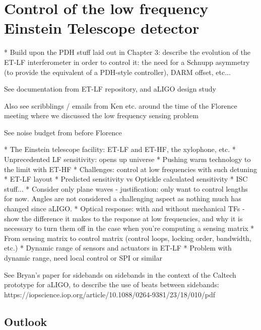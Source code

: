 \chapter{Control of the low frequency Einstein Telescope detector}
\label{c:et-lf-control}

  * Build upon the PDH stuff laid out in Chapter 3: describe the evolution of the ET-LF interferometer in order to control it: the need for a Schnupp asymmetry (to provide the equivalent of a PDH-style controller), DARM offset, etc...
  
  See documentation from ET-LF repository, and aLIGO design study
  
  Also see scribblings / emails from Ken etc. around the time of the Florence meeting where we discussed the low frequency sensing problem
  
  See noise budget from before Florence

  * The Einstein telescope facility: ET-LF and ET-HF, the xylophone, etc.
    * Unprecedented LF sensitivity: opens up universe
    * Pushing warm technology to the limit with ET-HF
    * Challenges: control at low frequencies with such detuning
  * ET-LF layout
  * Predicted sensitivity vs Optickle calculated sensitivity
  * ISC stuff...
    * Consider only plane waves - justification: only want to control lengths for now. Angles are not considered a challenging aspect as nothing much has changed since aLIGO.
    * Optical response: with and without mechanical TFs - show the difference it makes to the response at low frequencies, and why it is necessary to turn them off in the case when you're computing a sensing matrix
    * From sensing matrix to control matrix (control loops, locking order, bandwidth, etc.)
    * Dynamic range of sensors and actuators in ET-LF
      * Problem with dynamic range, need local control or SPI or similar
  
  See Bryan's paper for sidebands on sidebands in the context of the Caltech prototype for aLIGO, to describe the use of beats between sidebands: https://iopscience.iop.org/article/10.1088/0264-9381/23/18/010/pdf

\section{Outlook}